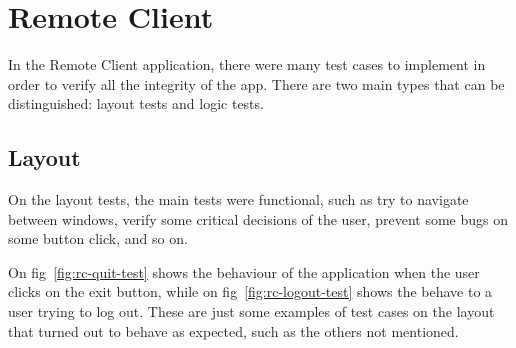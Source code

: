 \section{Remote Client}
\label{sec:test-rc}

In the Remote Client application, there were many test cases to implement in order to verify all the integrity of the app.
There are two main types that can be distinguished: layout tests and logic tests.

\subsection{Layout}
\label{subsec:layout-test-rc}

On the layout tests, the main tests were functional, such as try to navigate between windows, verify some critical decisions of the user, prevent some bugs on some button click, and so on.

On fig~\ref{fig:rc-quit-test} shows the behaviour of the application when the user clicks on the exit button, while on fig~\ref{fig:rc-logout-test} shows the behave to a user trying to log out. These are just some examples of test cases on the layout that turned out to behave as expected, such as the others not mentioned.

